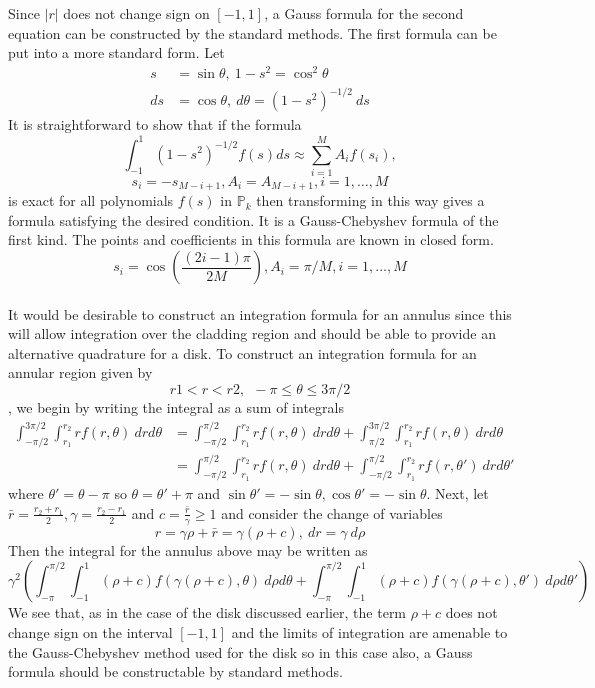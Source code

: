\documentclass[10pt,a4paper]{letter}
\begin{document}
Since $|r|$ does not change sign on $[-1,1]$, a Gauss formula for the second equation can be constructed by the standard methods.  The first formula can be put into a more standard form. Let
\begin{align*}
s&=\sin\theta, \ 1-s^2 = \cos^2 \theta\\
ds &= \cos\theta, \ d\theta = (1-s^2)^{-1/2}\ ds
\end{align*}
It is straightforward to show that if the formula
$$\int_{-1}^1 (1-s^2)^{-1/2} f(s) ds \approx \sum_{i=1}^M A_i f(s_i),$$ $$s_i = -s_{M-i+1}, A_i = A_{M-i+1}, i=1, \dots, M$$
is exact for all polynomials $f(s)$ in $\mathbb{P}_k$ then transforming in this way gives a formula satisfying the desired condition.  It is a Gauss-Chebyshev formula of the first kind.  The points and coefficients in this formula are known in closed form.
$$s_i = \cos\left(\frac{(2i-1)\pi}{2M}\right), A_i = \pi/M, i = 1, \dots, M$$\\


It would be desirable to construct an integration formula for an annulus since this will allow integration over the cladding region and should be able to provide an alternative quadrature for a disk.
To construct an integration formula for an annular region given by $$r1 < r < r2,\ \  -\pi \leq \theta \leq 3\pi/2$$, we begin by writing the integral as a sum of integrals
\begin{align*}
\int_{-\pi/2}^{3\pi/2} \int_{r_1}^{r_2} r f(r,\theta)\ dr d\theta &= \int_{-\pi/2}^{\pi/2} \int_{r_1}^{r_2} r f(r,\theta)\ dr d\theta + \int_{\pi/2}^{3\pi/2} \int_{r_1}^{r_2} r f(r,\theta)\ dr d\theta\\
&= \int_{-\pi/2}^{\pi/2} \int_{r_1}^{r_2} r f(r,\theta)\ dr d\theta + \int_{-\pi/2}^{\pi/2} \int_{r_1}^{r_2} r f(r,\theta')\ dr d\theta'
\end{align*}
where $\theta' = \theta - \pi$ so $\theta = \theta'+\pi$ and $\sin\theta' = -\sin\theta, \cos\theta' = -\sin\theta$.  Next, let $\bar{r} = \frac{r_2+r_1}{2}, \gamma = \frac{r_2-r_1}{2}$ and $c = \frac{\bar{r}}{\gamma} \geq 1$ and consider the change of variables$$r = \gamma \rho + \bar{r} = \gamma(\rho + c),\ dr = \gamma\ d\rho$$
Then the integral for the annulus above may be written as 
$$\gamma^2\left(\int_{-\pi}^{\pi/2}\int_{-1}^1 (\rho + c) f(\gamma(\rho + c), \theta) \ d\rho d\theta +
\int_{-\pi}^{\pi/2}\int_{-1}^1 (\rho + c) f(\gamma(\rho + c), \theta') \ d\rho d\theta'\right)$$
We see that, as in the case of the disk discussed earlier, the term $\rho + c$ does not change sign on the interval $[-1,1]$ and the limits of integration are amenable to the Gauss-Chebyshev method used for the disk so in this case also, a Gauss formula should be constructable by standard methods.\\
\end{document}
